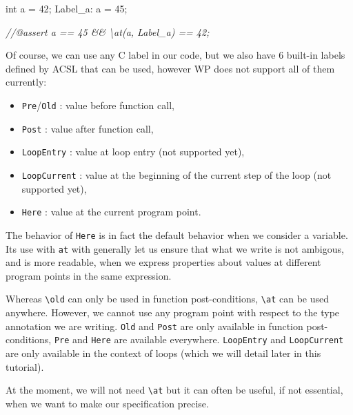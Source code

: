 \documentclass[12pt,francais,]{scrbook}
\newenvironment{Shaded}{}{}
\newcommand{\DataTypeTok}[1]{\textcolor[rgb]{0.56,0.13,0.00}{{#1}}}
\newcommand{\DecValTok}[1]{\textcolor[rgb]{0.25,0.63,0.44}{{#1}}}
\newcommand{\CommentTok}[1]{\textcolor[rgb]{0.38,0.63,0.69}{\textit{{#1}}}}
\newcommand{\NormalTok}[1]{{#1}}
\providecommand{\tightlist}{%
  \setlength{\itemsep}{0pt}\setlength{\parskip}{0pt}}
\newenvironment{zdsblock}[1]{%
  \tcolorbox[beamer,%
    noparskip,breakable,
    colback=LightBlue,colframe=DarkBlue,%
    colbacklower=DarkBlue,%
    title=#1]
}{\endtcolorbox}
\begin{document}
\begin{footnotesize}\begin{Shaded}
\begin{Highlighting}[]
  \DataTypeTok{int} \NormalTok{a = }\DecValTok{42}\NormalTok{;}
 \NormalTok{Label_a:}
  \NormalTok{a = }\DecValTok{45}\NormalTok{;}

  \CommentTok{//@assert a == 45 && \textbackslash{}at(a, Label_a) == 42;}
\end{Highlighting}
\end{Shaded}\end{footnotesize}

Of course, we can use any C label in our code, but we also have 6
built-in labels defined by ACSL that can be used, however WP does not
support all of them currently:

\begin{itemize}
\tightlist
\item
  \texttt{Pre}/\texttt{Old} : value before function call,
\item
  \texttt{Post} : value after function call,
\item
  \texttt{LoopEntry} : value at loop entry (not supported yet),
\item
  \texttt{LoopCurrent} : value at the beginning of the current step of
  the loop (not supported yet),
\item
  \texttt{Here} : value at the current program point.
\end{itemize}

\begin{zdsblock}{Information}
  The behavior of \texttt{Here} is in fact the default behavior when we
  consider a variable. Its use with \texttt{at} with generally let us
  ensure that what we write is not ambigous, and is more readable, when
  we express properties about values at different program points in the
  same expression.
\end{zdsblock}

Whereas \texttt{\textbackslash{}old} can only be used in function
post-conditions, \texttt{\textbackslash{}at} can be used anywhere.
However, we cannot use any program point with respect to the type
annotation we are writing. \texttt{Old} and \texttt{Post} are only
available in function post-conditions, \texttt{Pre} and \texttt{Here}
are available everywhere. \texttt{LoopEntry} and \texttt{LoopCurrent}
are only available in the context of loops (which we will detail later
in this tutorial).

At the moment, we will not need \texttt{\textbackslash{}at} but it can
often be useful, if not essential, when we want to make our
specification precise.
\end{document}
